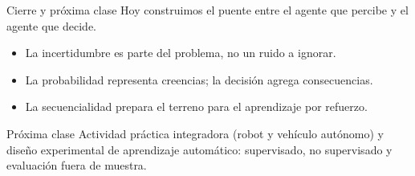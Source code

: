 \documentclass[aspectratio=169,10pt]{beamer}
\begin{document}
\begin{frame}{Cierre y próxima clase}
  \small
  Hoy construimos el puente entre el agente que percibe y el agente que decide.
  \begin{itemize}
    \item La incertidumbre es parte del problema, no un ruido a ignorar.
    \item La probabilidad representa creencias; la decisión agrega consecuencias.
    \item La secuencialidad prepara el terreno para el aprendizaje por refuerzo.
  \end{itemize}
  \vfill
  \begin{block}{Próxima clase}
    Actividad práctica integradora (robot y vehículo autónomo) y diseño experimental de aprendizaje automático: supervisado, no supervisado y evaluación fuera de muestra.
  \end{block}
\end{frame}
\end{document}
